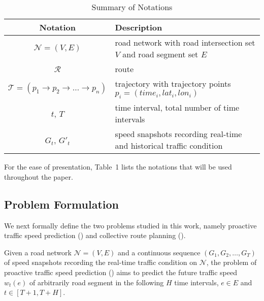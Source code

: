 \begin{table}[tb!]
\label{tab-data-stat}
\caption{Summary of Notations}
\vspace{-2.5ex}
\begin{center}
\begin{tabular}{|c|l|} \hline
\bf{Notation}   & \bf{Description}   \\ \hline\hline 
$\mathcal{N}=(V,E)$ & road network with road intersection set $V$ and road segment set $E$ \\ 
$\mathcal{R}$ & route \\
$\mathcal{T} = (p_1 \rightarrow p_2 \rightarrow \dots \rightarrow p_n)$ & trajectory with trajectory points $p_i=(time_i,lat_i,lon_i)$\\
$t$, $T$ & time interval, total number of time intervals \\
$G_t$, $G'_t$ & speed snapshots recording real-time and historical traffic condition  \\
\hline
\end{tabular}
\vspace{0ex}
\end{center}
\end{table}

For the ease of presentation, Table~1 lists the notations that will be used throughout the paper.

\subsection{Problem Formulation}
\label{subsec-problem}

We next formally define the two problems studied in this work, namely proactive traffic speed prediction (\ptsp) and collective route planning (\crp).

\begin{definition}Given a road network $\mathcal{N}=(V,E)$ and a continuous sequence $(G_1, G_2, \dots, G_T)$ of speed snapshots recording the real-time traffic condition on $\mathcal{N}$, the problem of proactive traffic speed prediction (\ptsp) aims to predict the future traffic speed $w_t(e)$ of arbitrarily road segment in the following $H$ time intervals, \ie $e\in E$ and $t\in[T+1,T+H]$.
\end{definition}

